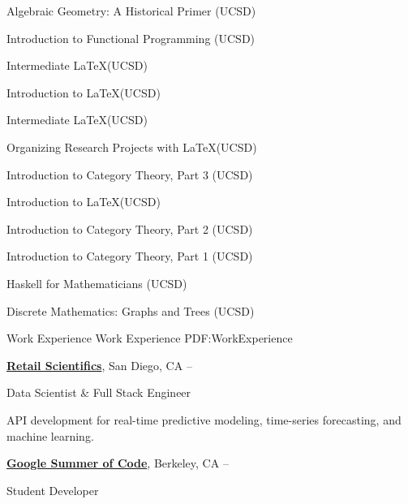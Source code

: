 \documentclass[letterpaper,MMMyyyy,nonstopmode]{simpleresumecv}
\begin{document}
\begin{Body}
\BulletItem
Algebraic Geometry: A Historical Primer (UCSD)
\hfill {}

\BulletItem
Introduction to Functional Programming (UCSD)
\hfill {}

\BulletItem
Intermediate \LaTeX (UCSD)
\hfill {}

\BulletItem
Introduction to \LaTeX (UCSD)
\hfill {}

\BulletItem
Intermediate \LaTeX (UCSD)
\hfill {}

\BulletItem
Organizing Research Projects with \LaTeX (UCSD)
\hfill {}

\BulletItem
Introduction to Category Theory, Part 3 (UCSD)
\hfill {}

\BigGap

\BulletItem
Introduction to \LaTeX (UCSD)
\hfill {}

\BulletItem
Introduction to Category Theory, Part 2 (UCSD)
\hfill {}

\BulletItem
Introduction to Category Theory, Part 1 (UCSD)
\hfill {}

\BulletItem
Haskell for Mathematicians (UCSD)
\hfill {}

\BulletItem
Discrete Mathematics: Graphs and Trees (UCSD)
\hfill {}



\Section
{Work Experience}
{Work Experience}
{PDF:WorkExperience}

\Entry
\href{https://www.retailscientifics.com/}
{\textbf{Retail Scientifics}},
San Diego, CA
\hfill
{} --

\Gap
\BulletItem
Data Scientist \& Full Stack Engineer

\begin{Detail}
\SubBulletItem
API development for real-time predictive modeling, time-series forecasting, and machine learning.
\end{Detail}

\BigGap
\Entry
\href{https://summerofcode.withgoogle.com/archive/}
{\textbf{Google Summer of Code}},
Berkeley, CA
\hfill
{} --

\Gap
\BulletItem
Student Developer


\end{Body}
\end{document}
